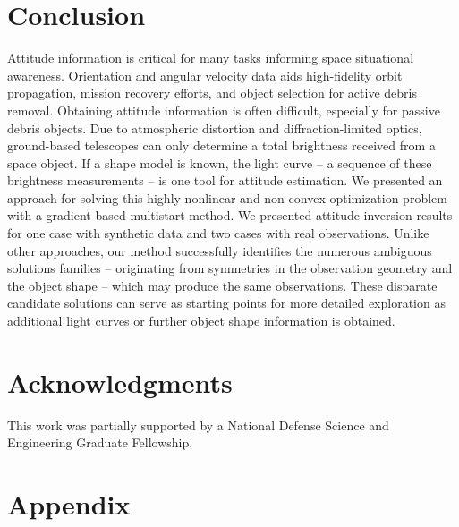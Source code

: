 \documentclass[a4paper,twocolumn]{spaceDebrisC} %
\begin{document}
\section{Conclusion}

Attitude information is critical for many tasks informing space situational awareness. Orientation and angular velocity data aids high-fidelity orbit propagation, mission recovery efforts, and object selection for active debris removal. Obtaining attitude information is often difficult, especially for passive debris objects. Due to atmospheric distortion and diffraction-limited optics, ground-based telescopes can only determine a total brightness received from a space object. If a shape model is known, the light curve -- a sequence of these brightness measurements -- is one tool for attitude estimation. We presented an approach for solving this highly nonlinear and non-convex optimization problem with a gradient-based multistart method. We presented attitude inversion results for one case with synthetic data and two cases with real observations. Unlike other approaches, our method successfully identifies the numerous ambiguous solutions families -- originating from symmetries in the observation geometry and the object shape -- which may produce the same observations. These disparate candidate solutions can serve as starting points for more detailed exploration as additional light curves or further object shape information is obtained.

\section*{Acknowledgments}

This work was partially supported by a National Defense Science and Engineering Graduate Fellowship.

\section*{Appendix}
\end{document}
